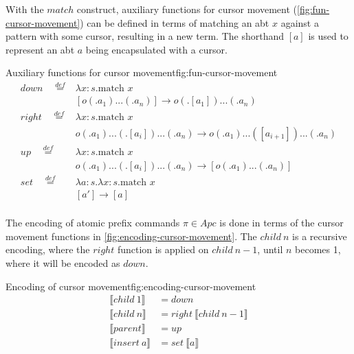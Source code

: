 With the $match$ construct, auxiliary functions for cursor movement (\cref{fig:fun-cursor-movement}) can be defined in terms of matching an abt $x$ against a pattern with some cursor, resulting in a new term. The shorthand $[a]$ is used to represent an abt $a$ being encapsulated with a cursor.

\begin{myfigure}{Auxiliary functions for cursor movement}{fig:fun-cursor-movement}
    \[
        \begin{aligned}
            down \quad \stackrel{def}{=}  &
            \lambda x : s.\text{match } x                                                                           \\
                                          & [o (.a_1)...(.a_n)] \rightarrow o(.[a_1])...(.a_n)                      \\
            right \quad \stackrel{def}{=} &
            \lambda x : s.\text{match } x                                                                           \\
                                          & o (.a_1)...(.[a_i])...(.a_n) \rightarrow o(.a_1)...([a_{i+1}])...(.a_n) \\
            up \quad \stackrel{def}{=}    &
            \lambda x : s.\text{match } x                                                                           \\
                                          & o (.a_1)...(.[a_i])...(.a_n) \rightarrow [o(.a_1)...(.a_n)]             \\
            set \quad \stackrel{def}{=}   &
            \lambda a : s.\lambda x : s.\text{match } x                                                             \\
                                          & [a'] \rightarrow [a]                                                    \\
        \end{aligned}
    \]
\end{myfigure}

The encoding of atomic prefix commands $\pi \in Apc$ is done in terms of the cursor movement functions in \cref{fig:encoding-cursor-movement}. The $child \ n$ is a recursive encoding, where the $right$ function is applied on $child \ n - 1$, until $n$ becomes 1, where it will be encoded as $down$.

\begin{myfigure}{Encoding of cursor movement}{fig:encoding-cursor-movement}
    \[
        \begin{aligned}
            \llbracket child \ 1 \rrbracket  & = down                                        \\
            \llbracket child \ n \rrbracket  & = right \ \llbracket child \ n - 1 \rrbracket \\
            \llbracket parent \rrbracket     & = up                                          \\
            \llbracket insert \ a \rrbracket & = set \ \llbracket a \rrbracket
        \end{aligned}
    \]
\end{myfigure}

